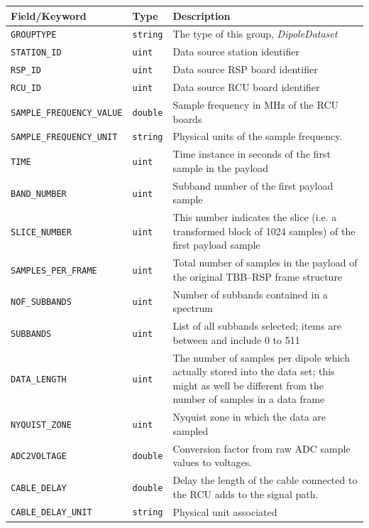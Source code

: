 \documentclass[a4paper,10pt,bibtotoc]{scrartcl}
\begin{document}
\begin{table}[htbp]
  \centering
  \begin{tabular}{|llp{7.5cm}|}
    \hline
    \sc Field/Keyword & \sc Type &  Description \\
    \hline \hline
    \verb|GROUPTYPE| & \texttt{string} & The type of this group, \textsl{DipoleDataset} \\
    \verb|STATION_ID| & \texttt{uint} & Data source station identifier \\
    \verb|RSP_ID| & \verb|uint| & Data source RSP board identifier \\
    \verb|RCU_ID| & \verb|uint| & Data source RCU board identifier \\
    \verb|SAMPLE_FREQUENCY_VALUE| & \verb|double| & Sample frequency in
    MHz of the RCU boards \\
    \verb|SAMPLE_FREQUENCY_UNIT| & \verb|string| & Physical units of the
    sample frequency. \\
    \verb|TIME| & \verb|uint| & Time instance in seconds of the first
    sample in the payload \\
    \verb|BAND_NUMBER| & \verb|uint| & Subband number of the first
    payload sample \\
    \verb|SLICE_NUMBER| & \verb|uint| & This number indicates the slice
    (i.e. a transformed block of 1024 samples) of the first payload sample \\
    \verb|SAMPLES_PER_FRAME| & \verb|uint| & Total number of samples
    in the payload of the original TBB--RSP frame structure \\
    \verb|NOF_SUBBANDS| & \verb|uint| & Number of subbands contained in a spectrum \\
    \verb|SUBBANDS| & \verb|uint| & List of all subbands selected; items are between
    and include 0 to 511 \\
    \verb|DATA_LENGTH| & \verb|uint| & The number of samples per dipole
    which actually stored into the data set; this might as well be different from
    the number of samples in a data frame \\
    \verb|NYQUIST_ZONE| & \verb|uint| & Nyquist zone in which the
    data are sampled \\
    \verb|ADC2VOLTAGE| & \verb|double| & Conversion factor from raw
    ADC sample values to voltages. \\
    \verb|CABLE_DELAY| & \verb|double| & Delay the length of the cable
    connected to the RCU adds to the signal path. \\
    \verb|CABLE_DELAY_UNIT| & \verb|string| & Physical unit associated

\end{tabular}
\end{table}
\end{document}
